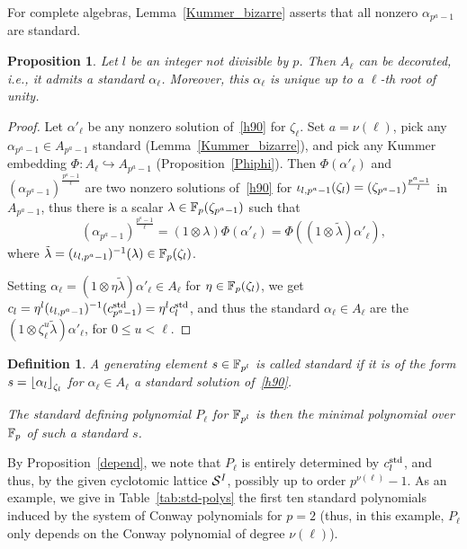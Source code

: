 \documentclass{sig-alternate}
\newtheorem{proposition}[theorem]{Proposition}
\newtheorem{definition}[theorem]{Definition}
\begin{document}
For complete algebras, Lemma~\ref{Kummer_bizarre} asserts that all nonzero $\alpha_{p^a-1}$ are standard.
\begin{proposition}
\label{standardexiste}
Let $l$ be an integer not divisible by $p$.
Then $A_\ell$ can be decorated, i.e., it admits a standard $\alpha_\ell$.
Moreover, this $\alpha_\ell$ is unique up to a $\ell$-th root of unity.
\end{proposition}
\begin{proof}
Let $\alpha'_\ell$ be any nonzero solution of~\eqref{h90} for $\zeta_\ell$.
Set $a=\nu(\ell)$, pick any $\alpha_{p^a-1}\in A_{p^a-1}$ standard (Lemma~\ref{Kummer_bizarre}),
and pick any Kummer embedding $\Phi:A_\ell\hookrightarrow A_{p^a-1}$ (Proposition~\ref{Phiphi}).
Then $\Phi(\alpha'_\ell)$ and $(\alpha_{p^a-1})^{\frac{p^a-1}{\ell}}$ are two nonzero solutions of~\eqref{h90}
for ${\iota_{{l},{p^a-1}}}(\zeta_l)=(\zeta_{p^a-1})^{\frac{p^a-1}{l}}$ in $A_{p^a-1}$, thus there is a scalar $\lambda\in\mathbb{F}_{p}(\zeta_{p^a-1})$
such that
\begin{equation*}
(\alpha_{p^a-1})^{\frac{p^a-1}{\ell}}=(1\otimes\lambda)\Phi(\alpha'_\ell)=\Phi((1\otimes\tilde\lambda)\alpha'_\ell),
\end{equation*}
where $\tilde\lambda=({\iota_{{l},{p^a-1}}})^{-1}(\lambda)\in\mathbb{F}_{p}(\zeta_{l})$.

Setting $\alpha_\ell=(1\otimes\eta\tilde\lambda)\alpha'_\ell\in A_\ell$ for $\eta\in\mathbb{F}_{p}(\zeta_l)$,
we get $c_{l}=\eta^l({\iota_{{l},{p^a-1}}})^{-1}(c^{\mathrm{std}}_{p^a-1})=\eta^lc^{\mathrm{std}}_l$, and
thus the standard $\alpha_\ell\in A_\ell$ are the $(1\otimes\zeta_\ell^u\tilde\lambda)\alpha'_\ell$, for $0\leq u<\ell$.
\end{proof}

\begin{definition}
\label{sstandard}
A generating element $s\in\mathbb{F}_{p^l}$ is called \emph{standard}
if it is of the form $s=\left\lfloor \alpha_{l} \right\rfloor_{\zeta_l}$ for $\alpha_{\ell}\in A_\ell$
a standard solution of~\eqref{h90}.

The \emph{standard defining polynomial} $P_\ell$ for $\mathbb{F}_{p^l}$ is then the minimal polynomial over $\mathbb{F}_p$
of such a standard $s$.
\end{definition}

By Proposition~\ref{depend}, we note that $P_\ell$ is entirely determined by $c^{\mathrm{std}}_{l}$,
and thus, by the given cyclotomic lattice $\mathcal{S}^{I}$, possibly up to order $p^{\nu(\ell)}-1$.
As an example, we give in Table~\ref{tab:std-polys} the first ten
standard polynomials induced by the system of Conway polynomials
for $p=2$ (thus, in this example, $P_\ell$ only depends on the Conway polynomial of degree $\nu(\ell)$).
\end{document}
